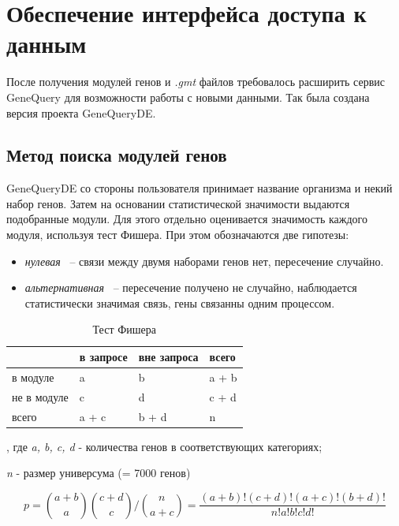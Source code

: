 \documentclass[times,specification,annotation]{itmo-student-thesis}
\begin{document}
\chapter{Обеспечение интерфейса доступа к данным}

После получения модулей генов и \textit{.gmt} файлов требовалось расширить сервис GeneQuery для возможности работы с новыми данными. Так была создана версия проекта GeneQueryDE. 

\section{Метод поиска модулей генов}

GeneQueryDE со стороны пользователя принимает название организма и некий набор генов. Затем на основании статистической значимости выдаются подобранные модули. Для этого отдельно оценивается значимость каждого модуля, используя тест Фишера. При этом обозначаются две гипотезы:
\begin{itemize}
    \item \textit{нулевая} ~-- связи между двумя наборами генов нет, пересечение случайно.
    \item \textit{альтернативная} ~-- пересечение получено не случайно, наблюдается статистически значимая связь, гены связанны одним процессом.
\end{itemize}

\begin{table}[!h]
    \caption{Тест Фишера}\label{fisherTable}
    \centering
    \begin{tabu}{ |X[l]|*{3}{X[c]|}}
        \hline
         & в запросе & вне запроса &  всего\strut\\ \hline
        в модуле & a & b &  a + b\\ \hline
        не в модуле & c & d &  c + d\\ \hline
         всего &  a + c &  b + d &  n\\ \hline
    \end{tabu}
\end{table}

, где \textit{a, b, c, d} - количества генов в соответствующих категориях​;

\textit{n} - размер универсума (= 7000 генов)

\begin{equation}
\label{pvalue}
    p = \binom{a+b}{a}\binom{c + d}{c}/\binom{n}{a+c} = \frac{(a+b)!(c+d)!(a+c)!(b+d)!}{n!a!b!c!d!}
\end{equation}
\end{document}
